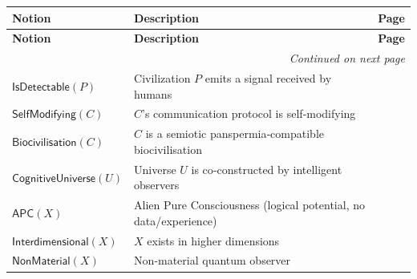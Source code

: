 \documentclass{amsart}
\newenvironment{notiontable}{%
	\renewcommand{\arraystretch}{1.2}%
	\setlength{\tabcolsep}{4pt}%
	\begin{longtable}{|l|l|c|}
		\hline
		\textbf{Notion} & \textbf{Description} & \textbf{Page} \\
		\hline
		\endfirsthead
		\hline
		\textbf{Notion} & \textbf{Description} & \textbf{Page} \\
		\hline
		\endhead
		\hline
		\multicolumn{3}{r}{\textit{Continued on next page}} \\
		\endfoot
		\hline
		\endlastfoot
	}{%
	\end{longtable}%
}
\theoremstyle{break}
\begin{document}
\begin{notiontable}
	$\mathsf{IsDetectable}(P)$ & Civilization $P$ emits a signal received by humans & \pageref{def:detectable} \\
	$\mathsf{SelfModifying}(C)$ & $C$'s communication protocol is self‑modifying & \pageref{def:selfmodcomm} \\
	$\mathsf{Biocivilisation}(C)$ & $C$ is a semiotic panspermia‑compatible biocivilisation & \pageref{def:biociv} \\
	$\mathsf{CognitiveUniverse}(U)$ & Universe $U$ is co‑constructed by intelligent observers & \pageref{def:coguni} \\
	$\mathsf{APC}(X)$ & Alien Pure Consciousness (logical potential, no data/experience) & \pageref{def:apc} \\
	$\mathsf{Interdimensional}(X)$ & $X$ exists in higher dimensions & \pageref{def:interdim} \\
	$\mathsf{NonMaterial}(X)$ & Non‑material quantum observer & \pageref{def:quantumobs} \\
	

\end{notiontable}
\end{document}
